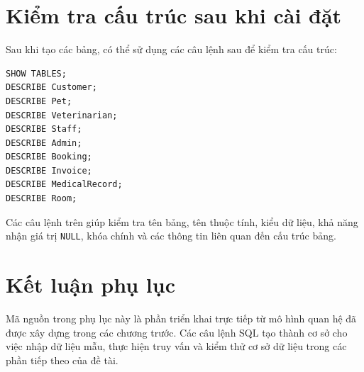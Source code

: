 \section{Kiểm tra cấu trúc sau khi cài đặt}
Sau khi tạo các bảng, có thể sử dụng các câu lệnh sau để kiểm tra cấu trúc:

\begin{verbatim}
SHOW TABLES;
DESCRIBE Customer;
DESCRIBE Pet;
DESCRIBE Veterinarian;
DESCRIBE Staff;
DESCRIBE Admin;
DESCRIBE Booking;
DESCRIBE Invoice;
DESCRIBE MedicalRecord;
DESCRIBE Room;
\end{verbatim}

Các câu lệnh trên giúp kiểm tra tên bảng, tên thuộc tính, kiểu dữ liệu, khả năng nhận giá trị \texttt{NULL}, khóa chính và các thông tin liên quan đến cấu trúc bảng.

\section{Kết luận phụ lục}
Mã nguồn trong phụ lục này là phần triển khai trực tiếp từ mô hình quan hệ đã được xây dựng trong các chương trước. Các câu lệnh SQL tạo thành cơ sở cho việc nhập dữ liệu mẫu, thực hiện truy vấn và kiểm thử cơ sở dữ liệu trong các phần tiếp theo của đề tài.
